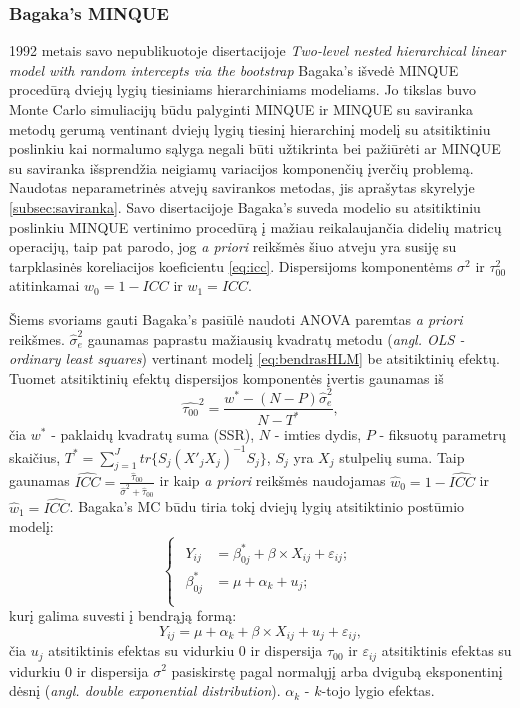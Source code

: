 \documentclass[11pt,a4paper]{article}
\begin{document}
\subsubsection{Bagaka's MINQUE}
1992 metais savo nepublikuotoje disertacijoje \textit{Two-level nested hierarchical linear model with random intercepts via the bootstrap}\cite{bagaka} Bagaka's išvedė MINQUE procedūrą dviejų lygių tiesiniams hierarchiniams modeliams. Jo tikslas buvo Monte Carlo simuliacijų būdu palyginti MINQUE ir MINQUE su saviranka metodų gerumą ventinant dviejų lygių tiesinį hierarchinį modelį su atsitiktiniu poslinkiu kai normalumo sąlyga negali būti užtikrinta bei pažiūrėti ar MINQUE su saviranka išsprendžia neigiamų variacijos komponenčių įverčių problemą. Naudotas neparametrinės atvejų savirankos metodas, jis aprašytas skyrelyje \ref{subsec:saviranka}. Savo disertacijoje Bagaka's suveda modelio su atsitiktiniu poslinkiu MINQUE vertinimo procedūrą į mažiau reikalaujančia didelių matricų operacijų, taip pat parodo, jog \textit{a priori} reikšmės šiuo atveju yra susiję su tarpklasinės koreliacijos koeficientu \ref{eq:icc}. Dispersijoms komponentėms $\sigma^2$ ir $\tau_{00}^2$ atitinkamai $w_0=1-ICC$ ir $w_1=ICC$.

\indent Šiems svoriams gauti Bagaka's pasiūlė naudoti ANOVA paremtas \textit{a priori} reikšmes. $\hat{\sigma}^2_{e}$ gaunamas paprastu mažiausių kvadratų metodu (\textit{angl. OLS - ordinary least squares}) vertinant modelį \ref{eq:bendrasHLM} be atsitiktinių efektų. Tuomet atsitiktinių efektų dispersijos komponentės įvertis gaunamas iš
\[
\hat{\tau_{00}}^2=\frac{w^*-(N-P)\hat{\sigma}_e^2}{N-T^*},
\]
čia $w^*$ - paklaidų kvadratų suma (SSR), $N$ - imties dydis, $P$ - fiksuotų parametrų skaičius, $T^*=\sum_{j=1}^J tr\{S_j(X'_jX_j)^{-1}S_j\}$, $S_j$ yra $X_j$ stulpelių suma. Taip gaunamas $\widehat{ICC} = \frac{\hat{\tau}_{00}}{\hat{\sigma}^2+\hat{\tau}_{00}}$ ir kaip \textit{a priori} reikšmės naudojamas $\hat{w}_0=1-\widehat{ICC}$ ir $\hat{w}_1=\widehat{ICC}$.
\indent Bagaka's MC būdu tiria tokį dviejų lygių atsitiktinio postūmio modelį:
\begin{equation}\label{eq:beqa}
\left\{
\begin{array}{l}
\begin{split}
Y_{ij} &= \beta^*_{0j}+ \beta \times X_{ij}+\varepsilon_{ij}; \\
\beta^*_{0j} &= \mu+\alpha_k+u_{j};\\
\end{split}
\end{array} \right. 
\end{equation}
kurį galima suvesti į bendrąją formą:
\begin{equation}\label{eq:beq}
Y_{ij}=\mu+\alpha_k+\beta\times X_{ij}+u_j+\varepsilon_{ij}, 
\end{equation}
čia $u_j$ atsitiktinis efektas su vidurkiu 0 ir dispersija $\tau_00$ ir $\varepsilon_{ij}$ atsitiktinis efektas su vidurkiu 0 ir dispersija $\sigma^2$ pasiskirstę pagal normalųjį arba dvigubą eksponentinį dėsnį (\textit{angl. double exponential distribution}). $\alpha_k$ - $k$-tojo lygio efektas.
\end{document}
